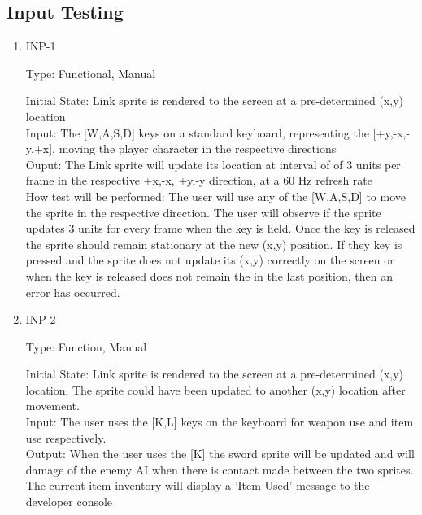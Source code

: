\documentclass[12pt, titlepage]{article}
\begin{document}
\subsection{Input Testing}

\begin{enumerate}
	
	\item{INP-1\\}
	
	Type: Functional, Manual
	
	Initial State: Link sprite is rendered to the screen at a pre-determined (x,y) location\\
	
	Input: The [W,A,S,D] keys on a standard keyboard, representing the [+y,-x,-y,+x], moving the player character in the respective directions\\
	
	Ouput: The Link sprite will update its location at interval of of 3 units per frame in the respective +x,-x, +y,-y direction, at a 60 Hz refresh rate\\
	
	How test will be performed: The user will use any of the [W,A,S,D] to move the sprite in the respective direction. The user will observe if the sprite updates 3 units for every frame when the key is held. Once the key is released the sprite should remain stationary at the new (x,y) position. If they key is pressed and the sprite does not update its (x,y) correctly on the screen or when the key is released does not remain the in the last position, then an error has occurred.\\
	
	\item{INP-2\\}
	
	Type: Function, Manual
	
	Initial State: Link sprite is rendered to the screen at a pre-determined (x,y) location. The sprite could have been updated to another (x,y) location after movement.\\
	
	Input: The user uses the [K,L] keys on the keyboard for weapon use and item use respectively.\\
	
	Output: When the user uses the [K] the sword sprite will be updated and will damage of the enemy AI when there is contact made between the two sprites. The current item inventory will display a 'Item Used' message to the developer console\\
	

\end{enumerate}
\end{document}
